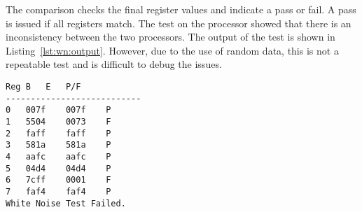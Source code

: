 The comparison checks the final register values and indicate a pass or fail. 
A pass is issued if all registers match. 
The test on the processor showed that there is an inconsistency between the two processors. 
The output of the test is shown in Listing~\ref{lst:wn:output}.
However, due to the use of random data, this is not a repeatable test and is difficult to debug the issues. 



\begin{lstlisting}[label=lst:wn:output,caption={Output of the white noise test}]
Reg	B	E	P/F
---------------------------
0	007f	007f	P
1	5504	0073	F
2	faff	faff	P
3	581a	581a	P
4	aafc	aafc	P
5	04d4	04d4	P
6	7cff	0001	F
7	faf4	faf4	P
White Noise Test Failed.
\end{lstlisting}

